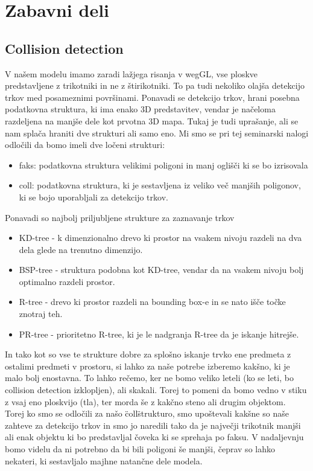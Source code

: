 \documentclass[10pt,a4paper]{article}
\begin{document}
\section{Zabavni deli}
\subsection{Collision detection}
V našem modelu imamo zaradi lažjega risanja v wegGL, vse ploskve predstavljene z trikotniki in ne z štirikotniki. To pa tudi nekoliko olajša detekcijo trkov med posameznimi površinami. Ponavadi se detekcijo trkov, hrani posebna podatkovna struktura, ki ima enako 3D predstavitev, vendar je načeloma razdeljena na manjše dele kot prvotna 3D mapa. Tukaj je tudi uprašanje, ali se nam splača hraniti dve strukturi ali samo eno. Mi smo se pri tej seminarski nalogi odločili da bomo imeli dve ločeni strukturi:
\begin{itemize}
\item faks: podatkovna struktura velikimi poligoni in manj oglišči ki se bo izrisovala 
\item coll: podatkovna struktura, ki je sestavljena iz veliko več manjših poligonov, ki se bojo uporabljali za detekcijo trkov.
\end{itemize}
Ponavadi so najbolj priljubljene strukture za zaznavanje trkov 
\begin{itemize}
\item KD-tree - k dimenzionalno drevo ki prostor na vsakem nivoju razdeli na dva dela glede na trenutno dimenzijo.
\item BSP-tree - struktura podobna kot KD-tree, vendar da na vsakem nivoju bolj optimalno razdeli prostor.
\item R-tree - drevo ki prostor razdeli na bounding box-e in se nato išče točke znotraj teh.
\item PR-tree - prioritetno R-tree, ki je le nadgranja R-tree da je iskanje hitrejše.
\end{itemize}
In tako kot so vse te strukture dobre za splošno iskanje trvko ene predmeta z ostalimi predmeti v prostoru, si lahko za naše potrebe izberemo kakšno, ki je malo bolj enostavna. To lahko rečemo, ker ne bomo veliko leteli (ko se leti, bo collision detection izklopljen), ali skakali. Torej to pomeni da bomo vedno v stiku z vsaj eno ploskvijo (tla), ter morda še z kakčno steno ali drugim objektom.\\
Torej ko smo se odločili za našo \"coll\" strukturo, smo upoštevali kakšne so naše zahteve za detekcijo trkov in smo jo naredili tako da je največji trikotnik manjši ali enak objektu ki bo predstavljal čoveka ki se sprehaja po faksu. V nadaljevnju bomo videlu da ni potrebno da bi bili poligoni še manjši, čeprav so lahko nekateri, ki sestavljalo majhne natančne dele modela.
\end{document}
